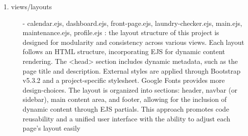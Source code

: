 \documentclass[conference]{IEEEtran}
\begin{document}
\begin{enumerate}
\begin{enumerate}
        \item views/layouts
        \begin{itemize}
            \item[-] calendar.ejs, dashboard.ejs, front-page.ejs, laundry-checker.ejs, main.ejs, maintenance.ejs, profile.ejs : the layout structure of this project is designed for modularity and consistency across various views. Each layout follows an HTML structure, incorporating EJS for dynamic content rendering. The <head> section includes dynamic metadata, such as the page title and description. External styles are applied through Bootstrap v5.3.2 and a project-specific stylesheet. Google Fonts provides more design-choices. The layout is organized into sections: header, navbar (or sidebar), main content area, and footer, allowing for the inclusion of dynamic content through EJS partials. This approach promotes code reusability and a unified user interface with the ability to adjust each page’s layout easily
        \end{itemize}


\end{enumerate}
\end{enumerate}
\end{document}

